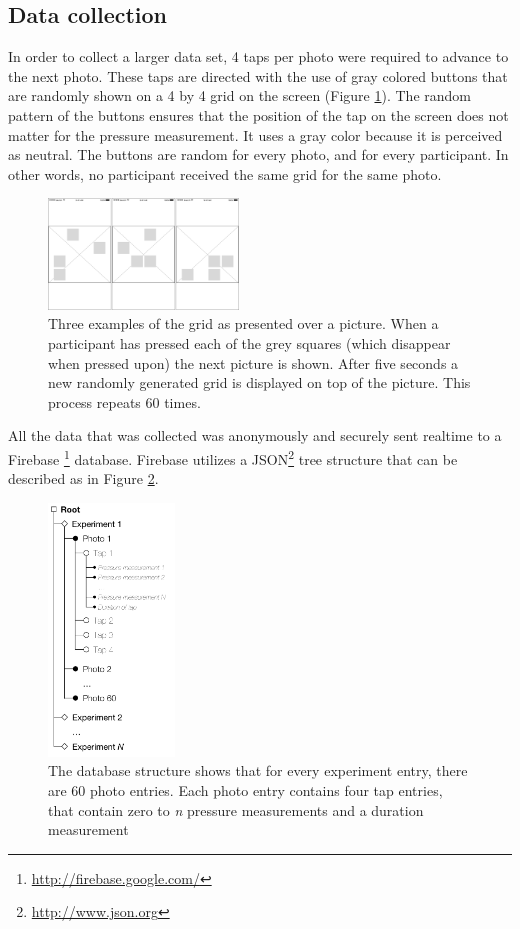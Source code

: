 \documentclass{sigchi}
\begin{document}
\subsection{Data collection} %
\label{sub:data_collection}
In order to collect a larger data set, 4 taps per photo were required to advance to the next photo. These taps are directed with the use of gray colored buttons that are randomly shown on a 4 by 4 grid on the screen (Figure \ref{fig:grid}). The random pattern of the buttons ensures that the position of the tap on the screen does not matter for the pressure measurement. It uses a gray color because it is perceived as neutral. The buttons are random for every photo, and for every participant. In other words, no participant received the same grid for the same photo.
\begin{figure}[h]
    \centering
    \includegraphics[width=0.45\textwidth]{images/Grid.png}
    \caption{Three examples of the grid as presented over a picture. When a participant has pressed each of the grey squares (which disappear when pressed upon) the next picture is shown. After five seconds a new randomly generated grid is displayed on top of the picture. This process repeats 60 times.}
    \label{fig:grid}
\end{figure}

All the data that was collected was anonymously and securely sent realtime to a Firebase \footnote{\url{http://firebase.google.com/}} database. Firebase utilizes a JSON\footnote{\url{http://www.json.org}} tree structure that can be described as in Figure \ref{fig:datastructure}.
\begin{figure}[h]
    \centering
    \includegraphics[width=0.3\textwidth]{images/Datastructure.png}
    \caption{The database structure shows that for every experiment entry, there are 60 photo entries. Each photo entry contains four tap entries, that contain zero to \textit{n} pressure measurements and a duration measurement}
    \label{fig:datastructure}
\end{figure}
\end{document}
